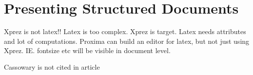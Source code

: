 


\chapter{Presenting Structured Documents}
\label{chap:presenting}

Xprez is not latex!! Latex is too complex. Xprez is target. Latex needs attributes and lot of computations. Proxima can build an editor for latex, but not just using Xprez. IE. fontsize etc will be visible in document level.



Cassowary is not cited in article




